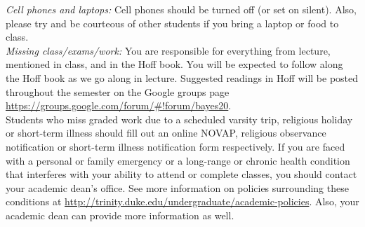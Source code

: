 \documentclass[11pt]{article}
\begin{document}
%
%

\emph{Cell phones and laptops:} Cell phones should be turned off (or set on silent). Also, please try and be courteous of other students if you bring a laptop or food to class. \\


\emph{Missing class/exams/work:}
You are responsible for everything from lecture, mentioned in class, and in the Hoff book. You will be expected to follow along the Hoff book as we go along in lecture. Suggested readings in Hoff will be posted throughout the semester on the Google groups page \url{https://groups.google.com/forum/#!forum/bayes20}.  \\

Students who miss graded work due to a scheduled varsity trip, religious holiday or short-term illness should fill out an online NOVAP, religious observance notification or short-term illness notification form respectively. If you are faced with a personal or family emergency or a long-range or chronic health condition that interferes with your ability to attend or complete classes, you should contact your academic dean's office. See more information on policies surrounding these conditions at \url{http://trinity.duke.edu/undergraduate/academic-policies}. Also, your academic dean can provide more information as well.\\
\end{document}
